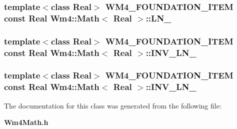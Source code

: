 \subsubsection{\setlength{\rightskip}{0pt plus 5cm}template$<$class Real$>$ WM4\_\-FOUNDATION\_\-ITEM const Real {\bf Wm4::Math}$<$ Real $>$::{\bf LN\_}\hspace{0.3cm}{\tt  [static]}}\label{classWm4_1_1Math_d55b067b5a62e2bbc5f3f3395225c788}


\subsubsection{\setlength{\rightskip}{0pt plus 5cm}template$<$class Real$>$ WM4\_\-FOUNDATION\_\-ITEM const Real {\bf Wm4::Math}$<$ Real $>$::{\bf INV\_\-LN\_}\hspace{0.3cm}{\tt  [static]}}\label{classWm4_1_1Math_2bd9e85cc86fee05319aebe17706c932}


\subsubsection{\setlength{\rightskip}{0pt plus 5cm}template$<$class Real$>$ WM4\_\-FOUNDATION\_\-ITEM const Real {\bf Wm4::Math}$<$ Real $>$::{\bf INV\_\-LN\_}\hspace{0.3cm}{\tt  [static]}}\label{classWm4_1_1Math_405239570d04875b42920e86207f0327}




The documentation for this class was generated from the following file:\begin{CompactItemize}
\item 
{\bf Wm4Math.h}\end{CompactItemize}
